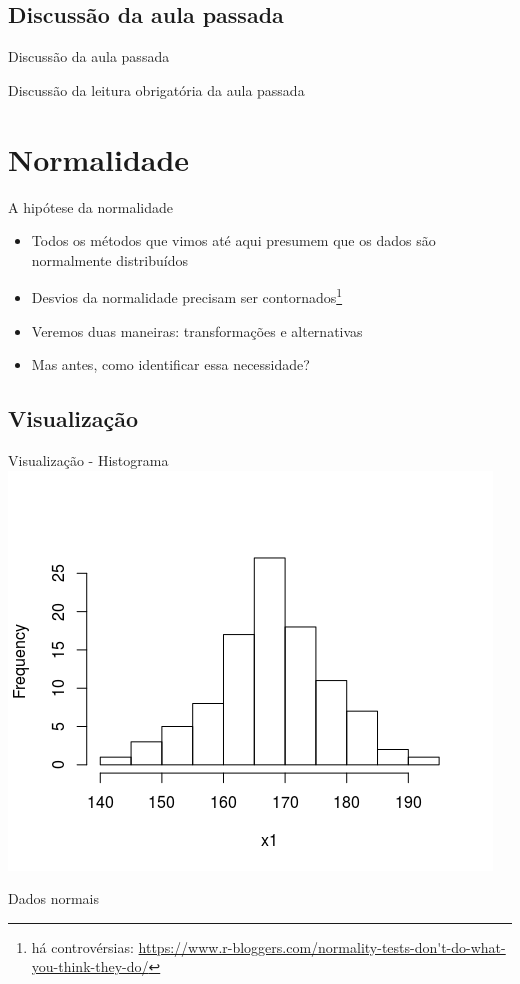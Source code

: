 \documentclass{beamer}
\begin{document}
\subsection{Discussão da aula passada}

\begin{frame}{Discussão da aula passada}
  \begin{block}{}
    Discussão da leitura obrigatória da aula passada
  \end{block}
\end{frame}

\section{Normalidade}

\begin{frame}{A hipótese da normalidade}
  \begin{itemize}
  \item Todos os métodos que vimos até aqui presumem que os dados são normalmente distribuídos
  \item Desvios da normalidade precisam ser contornados\footnote{há controvérsias: \url{https://www.r-bloggers.com/normality-tests-don't-do-what-you-think-they-do/}}
  \item Veremos duas maneiras: transformações e alternativas
  \item Mas antes, como identificar essa necessidade?
  \end{itemize}

\end{frame}

\subsection{Visualização}

\begin{frame}{Visualização - Histograma}
  \centering
  \includegraphics[width=.7\textwidth]{Cap37-38/normal1-h}

  Dados normais
\end{frame}
\end{document}
